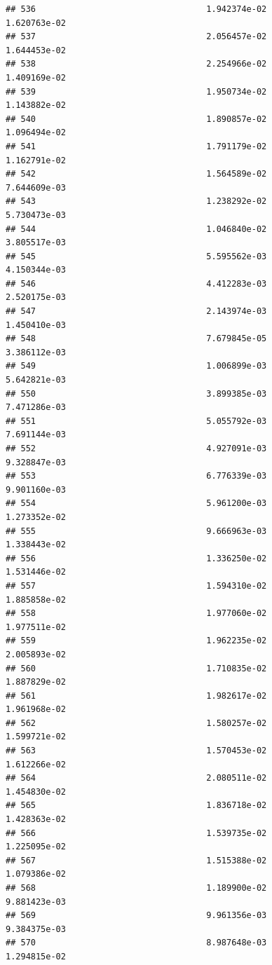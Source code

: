 \documentclass[
]{article}
\begin{document}
\begin{verbatim}
## 536                                  1.942374e-02           1.620763e-02
## 537                                  2.056457e-02           1.644453e-02
## 538                                  2.254966e-02           1.409169e-02
## 539                                  1.950734e-02           1.143882e-02
## 540                                  1.890857e-02           1.096494e-02
## 541                                  1.791179e-02           1.162791e-02
## 542                                  1.564589e-02           7.644609e-03
## 543                                  1.238292e-02           5.730473e-03
## 544                                  1.046840e-02           3.805517e-03
## 545                                  5.595562e-03           4.150344e-03
## 546                                  4.412283e-03           2.520175e-03
## 547                                  2.143974e-03           1.450410e-03
## 548                                  7.679845e-05           3.386112e-03
## 549                                  1.006899e-03           5.642821e-03
## 550                                  3.899385e-03           7.471286e-03
## 551                                  5.055792e-03           7.691144e-03
## 552                                  4.927091e-03           9.328847e-03
## 553                                  6.776339e-03           9.901160e-03
## 554                                  5.961200e-03           1.273352e-02
## 555                                  9.666963e-03           1.338443e-02
## 556                                  1.336250e-02           1.531446e-02
## 557                                  1.594310e-02           1.885858e-02
## 558                                  1.977060e-02           1.977511e-02
## 559                                  1.962235e-02           2.005893e-02
## 560                                  1.710835e-02           1.887829e-02
## 561                                  1.982617e-02           1.961968e-02
## 562                                  1.580257e-02           1.599721e-02
## 563                                  1.570453e-02           1.612266e-02
## 564                                  2.080511e-02           1.454830e-02
## 565                                  1.836718e-02           1.428363e-02
## 566                                  1.539735e-02           1.225095e-02
## 567                                  1.515388e-02           1.079386e-02
## 568                                  1.189900e-02           9.881423e-03
## 569                                  9.961356e-03           9.384375e-03
## 570                                  8.987648e-03           1.294815e-02

\end{verbatim}
\end{document}
